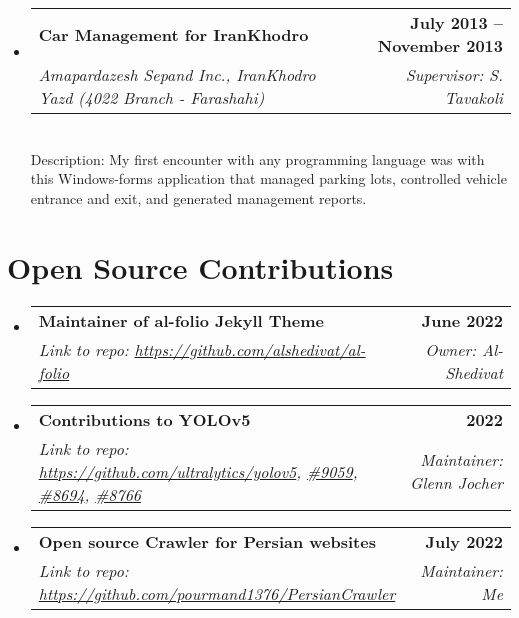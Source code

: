 \documentclass[letterpaper,11pt]{article}
\makeatletter
\newcommand{\resumeSubheading}[4]{
  \vspace{-2pt}\item
    \begin{tabular*}{1.0\textwidth}[t]{l@{\extracolsep{\fill}}r}
      \textbf{#1} & \textbf{\small #2} \\
    \textcolor{sgray} {\textit{\small#3}} & \textcolor{sgray}{ \textit{\small #4} }\\
    \end{tabular*}\vspace{-7pt}
}
\newcommand{\resumeSubheadingD}[5]{
  \vspace{-2pt}\item
    \begin{tabular*}{1.0\textwidth}[t]{l@{\extracolsep{\fill}}r}
      \textbf{#1} & \textbf{\small #2} \\
    \textcolor{sgray} {\textit{\small#3}} & \textcolor{sgray}{ \textit{\small #4} }\\
    \end{tabular*} %
    \\ \vspace{3pt}
    Description:{#5}
}
\newcommand{\resumeSubHeadingListStart}{\begin{itemize}[leftmargin=0.0in, label={}]}
\newcommand{\resumeSubHeadingListEnd}{\end{itemize}}
\makeatother
\begin{document}
\resumeSubHeadingListStart
\resumeSubheadingD
{Car Management for IranKhodro}{July 2013 – November 2013}
{Amapardazesh Sepand Inc., IranKhodro Yazd (4022 Branch - Farashahi)}{Supervisor: S. Tavakoli}
{ My first encounter with any programming language was with this Windows-forms application that managed parking lots, controlled vehicle entrance and exit, and generated management reports. }
\resumeSubHeadingListEnd


\section{Open Source Contributions}
\resumeSubHeadingListStart
\resumeSubheading
{Maintainer of al-folio Jekyll Theme}{June 2022}
{Link to repo: \url{https://github.com/alshedivat/al-folio} }{Owner: Al-Shedivat}{
	
}
\resumeSubHeadingListEnd



\resumeSubHeadingListStart
\resumeSubheading
{Contributions to YOLOv5}{2022}
{Link to repo: \url{https://github.com/ultralytics/yolov5},
	\href{https://github.com/ultralytics/yolov5/issues/9059}{\#9059},
	\href{https://github.com/ultralytics/yolov5/pull/8694}{\#8694},
	\href{https://github.com/ultralytics/yolov5/pull/8766}{\#8766}  
}{Maintainer: Glenn Jocher}{ 
}
\resumeSubHeadingListEnd

\resumeSubHeadingListStart
\resumeSubheading
{Open source Crawler for Persian websites}{July 2022}
{Link to repo: \url{https://github.com/pourmand1376/PersianCrawler} }{Maintainer: Me}
\resumeSubHeadingListEnd
\end{document}
